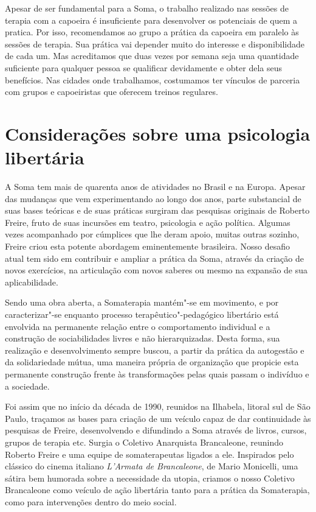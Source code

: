 Apesar de ser fundamental para a Soma, o trabalho realizado nas sessões
de terapia com a capoeira é insuficiente para desenvolver os potenciais
de quem a pratica. Por isso, recomendamos ao grupo a prática da capoeira
em paralelo às sessões de terapia. Sua prática vai depender muito do
interesse e disponibilidade de cada um. Mas acreditamos que duas vezes
por semana seja uma quantidade suficiente para qualquer pessoa se
qualificar devidamente e obter dela seus benefícios. Nas cidades onde
trabalhamos, costumamos ter vínculos de parceria com grupos e
capoeiristas que oferecem treinos regulares.

\chapter*{Considerações sobre uma psicologia libertária}

A Soma tem mais de quarenta anos de atividades no Brasil e na Europa.
Apesar das mudanças que vem experimentando ao longo dos anos, parte
substancial de suas bases teóricas e de suas práticas surgiram das
pesquisas originais de Roberto Freire, fruto de suas incursões em
teatro, psicologia e ação política. Algumas vezes acompanhado por
cúmplices que lhe deram apoio, muitas outras sozinho, Freire criou esta
potente abordagem eminentemente brasileira. Nosso desafio atual tem sido
em contribuir e ampliar a prática da Soma, através da criação de novos
exercícios, na articulação com novos saberes ou mesmo na expansão de sua
aplicabilidade.

Sendo uma obra aberta, a Somaterapia mantém"-se em movimento, e por
caracterizar"-se enquanto processo terapêutico"-pedagógico libertário está
envolvida na permanente relação entre o comportamento individual e a
construção de sociabilidades livres e não hierarquizadas. Desta forma,
sua realização e desenvolvimento sempre buscou, a partir da prática da
autogestão e da solidariedade mútua, uma maneira própria de organização
que propicie esta permanente construção frente às transformações pelas quais
passam o indivíduo e a sociedade.

Foi assim que no início da década de 1990, reunidos na Ilhabela, litoral
sul de São Paulo, traçamos as bases para criação de um veículo capaz de
dar continuidade às pesquisas de Freire, desenvolvendo e difundindo a
Soma através de livros, cursos, grupos de terapia etc. Surgia o Coletivo
Anarquista Brancaleone, reunindo Roberto Freire e uma equipe de
somaterapeutas ligados a ele. Inspirados pelo clássico do cinema
italiano \emph{L'Armata de Brancaleone}, de Mario Monicelli, uma sátira
bem humorada sobre a necessidade da utopia, criamos o nosso Coletivo
Brancaleone como veículo de ação libertária tanto para a prática da
Somaterapia, como para intervenções dentro do meio social.

